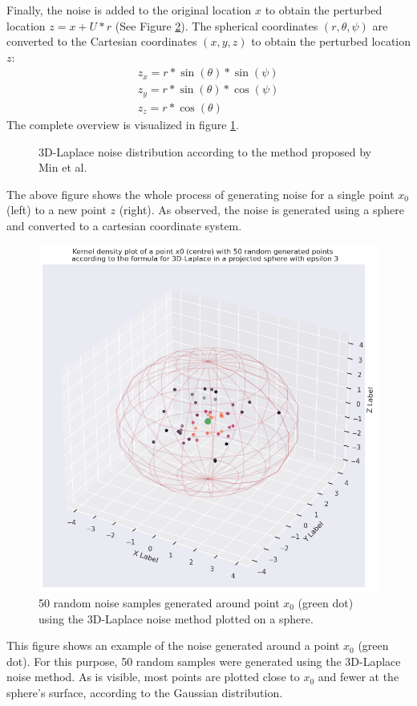 Finally, the noise is added to the original location $x$ to obtain the perturbed location $z = x + U*r$ (See Figure \ref{fig:3d-laplace-noise}).
The spherical coordinates $(r, \theta, \psi)$ are converted to the Cartesian coordinates $(x, y, z)$ to obtain the perturbed location $z$:
\begin{align*}
  z_x = r * \sin(\theta) * \sin(\psi) \\
  z_y = r * \sin(\theta) * \cos(\psi) \\
  z_z = r * \cos(\theta)
\end{align*}
The complete overview is visualized in figure \ref{fig:3d-laplace}.
\begin{figure}[H]
  
  \caption{3D-Laplace noise distribution according to the method proposed by Min et al. \citep{9646489}}
  \label{fig:3d-laplace}
\end{figure}
The above figure shows the whole process of generating noise for a single point $x_0$ (left) to a new point $z$ (right).
As observed, the noise is generated using a sphere and converted to a cartesian coordinate system.
\newpage
\begin{figure}[H]
  \includegraphics[width=1\textwidth]{TheorethicalFramework/ND-Laplace/Images/3d_laplace_noise.png}
  \caption{50 random noise samples generated around point $x_0$ (green dot) using the 3D-Laplace noise method \citep{9646489} plotted on a sphere.}
  \label{fig:3d-laplace-noise}
\end{figure}
This figure shows an example of the noise generated around a point $x_0$ (green dot).
For this purpose, 50 random samples were generated using the 3D-Laplace noise method.
As is visible, most points are plotted close to $x_0$ and fewer at the sphere's surface, according to the Gaussian distribution.

